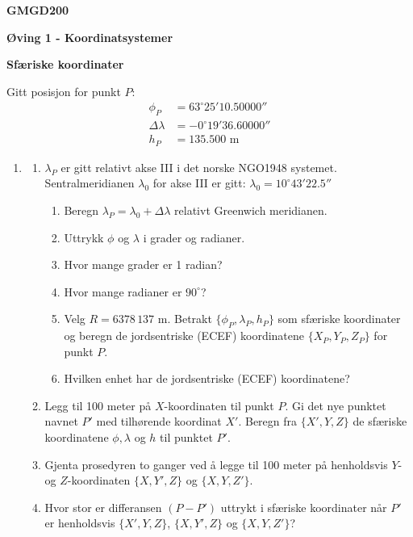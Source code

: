 \documentclass[11pt,a4paper]{article}
\begin{document}
{\noindent\large\textbf{GMGD200}}

\vspace{0.2cm}
{\noindent\Large\textbf{Øving 1 - Koordinatsystemer}}

\vspace{0.6cm}
{\noindent\large\textbf{Sfæriske koordinater}}

\vspace{0.3cm}
\noindent Gitt posisjon for punkt $P$:
\begin{align*}
\phi_P &= 63^\circ 25' 10.50000'' \\
\Delta\lambda &= -0^\circ 19' 36.60000'' \\
h_P &= 135.500\text{ m}
\end{align*}

\begin{enumerate}
    \item 
    \begin{enumerate}
        \item $\lambda_P$ er gitt relativt akse III i det norske NGO1948 systemet. Sentralmeridianen $\lambda_0$ for akse III er gitt: $\lambda_0 = 10^\circ 43' 22.5''$
        \begin{enumerate}
            \item[i.] Beregn $\lambda_P = \lambda_0 + \Delta\lambda$ relativt Greenwich meridianen.
            \item[ii.] Uttrykk $\phi$ og $\lambda$ i grader og radianer.
            \item[iii.] Hvor mange grader er 1 radian?
            \item[iv.] Hvor mange radianer er $90^\circ$?
            \item[v.] Velg $R = 6378\,137\text{ m}$. Betrakt $\{\phi_P, \lambda_P, h_P\}$ som sfæriske koordinater og beregn de jordsentriske (ECEF) koordinatene $\{X_P, Y_P, Z_P\}$ for punkt $P$.
            \item[vi.] Hvilken enhet har de jordsentriske (ECEF) koordinatene?
        \end{enumerate}
        \item Legg til 100 meter på $X$-koordinaten til punkt $P$. Gi det nye punktet navnet $P'$ med tilhørende koordinat $X'$. Beregn fra $\{X', Y, Z\}$ de sfæriske koordinatene $\phi, \lambda$ og $h$ til punktet $P'$.
        \item Gjenta prosedyren to ganger ved å legge til 100 meter på henholdsvis $Y$- og $Z$-koordinaten $\{X, Y', Z\}$ og $\{X, Y, Z'\}$.
        \item Hvor stor er differansen $(P - P')$ uttrykt i sfæriske koordinater når $P'$ er henholdsvis $\{X', Y, Z\}$, $\{X, Y', Z\}$ og $\{X, Y, Z'\}$?
    \end{enumerate}
\end{enumerate}
\end{document}
